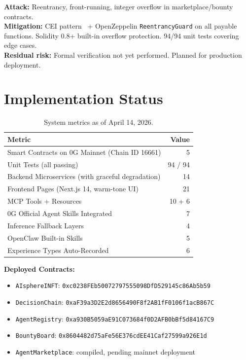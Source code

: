 \documentclass[10pt,a4paper]{article}
\theoremstyle{definition}
\theoremstyle{plain}
\begin{document}
\begin{threatbox}
\textbf{Attack:} Reentrancy, front-running, integer overflow in marketplace/bounty contracts.\\
\textbf{Mitigation:} CEI pattern~\cite{reentrancy-survey2024} + OpenZeppelin \texttt{ReentrancyGuard} on all payable functions. Solidity 0.8+ built-in overflow protection. 94/94 unit tests covering edge cases.\\
\textbf{Residual risk:} Formal verification not yet performed. Planned for production deployment.
\end{threatbox}


\section{Implementation Status}
\label{sec:impl}

\begin{table}[H]
\centering
\caption{System metrics as of April 14, 2026.}
\renewcommand{\arraystretch}{1.15}
\footnotesize
\begin{tabularx}{\textwidth}{@{}Xr@{}}
\toprule
\textbf{Metric} & \textbf{Value} \\
\midrule
Smart Contracts on 0G Mainnet (Chain ID 16661) & 5 \\
Unit Tests (all passing)                        & 94 / 94 \\
Backend Microservices (with graceful degradation) & 14 \\
Frontend Pages (Next.js 14, warm-tone UI)       & 21 \\
MCP Tools + Resources                           & 10 + 6 \\
0G Official Agent Skills Integrated             & 7 \\
Inference Fallback Layers                       & 4 \\
OpenClaw Built-in Skills                        & 5 \\
Experience Types Auto-Recorded                  & 6 \\
\bottomrule
\end{tabularx}
\end{table}

\noindent\textbf{Deployed Contracts:}
\begin{itemize}[leftmargin=1.8em, itemsep=1pt, parsep=0pt]
  \item \texttt{AIsphereINFT}: \texttt{0xc0238FEb50072797555098DfD529145c86Ab5b59}
  \item \texttt{DecisionChain}: \texttt{0xaF39a3D2E2d8656490F8f2AB1fF0106f1acB867C}
  \item \texttt{AgentRegistry}: \texttt{0xa930B5059aE91C073684f0D2AFB0bBf5d84167C9}
  \item \texttt{BountyBoard}: \texttt{0x8604482d75aFe56E376cdEE41Caf27599a926E1d}
  \item \texttt{AgentMarketplace}: compiled, pending mainnet deployment
\end{itemize}
\end{document}

